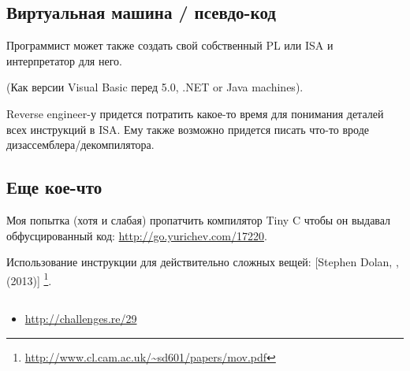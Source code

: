 \subsection{Виртуальная машина / псевдо-код}

Программист может также создать свой собственный \ac{PL} или \ac{ISA} и интерпретатор для него.

(Как версии Visual Basic перед 5.0, .NET or Java machines).

Reverse engineer-у придется потратить какое-то время для понимания деталей всех инструкций в \ac{ISA}.
Ему также возможно придется писать что-то вроде дизассемблера/декомпилятора.

\subsection{Еще кое-что}

Моя попытка (хотя и слабая) пропатчить компилятор Tiny C чтобы он выдавал обфусцированный код:
\url{http://go.yurichev.com/17220}.

Использование инструкции \MOV для действительно сложных вещей: 
[Stephen Dolan, , (2013)]
\footnote{\AlsoAvailableAs \url{http://www.cl.cam.ac.uk/~sd601/papers/mov.pdf}}. 

\subsection{\Exercise}

\begin{itemize}
	\item \url{http://challenges.re/29}
\end{itemize}

